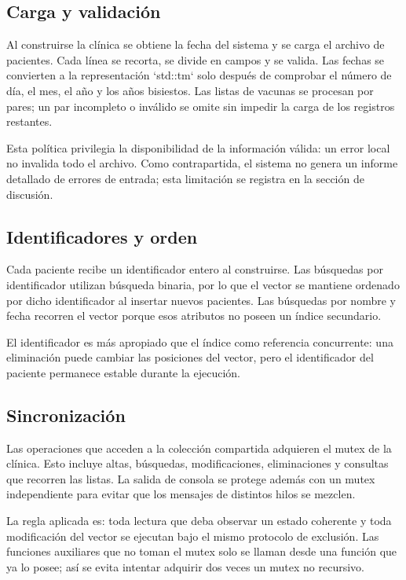 \documentclass[12pt,letterpaper]{article}
\begin{document}
\subsection{Carga y validación}

Al construirse la clínica se obtiene la fecha del sistema y se carga el archivo
de pacientes. Cada línea se recorta, se divide en campos y se valida. Las
fechas se convierten a la representación `std::tm` solo después de comprobar
el número de día, el mes, el año y los años bisiestos. Las listas de vacunas se
procesan por pares; un par incompleto o inválido se omite sin impedir la carga
de los registros restantes.

Esta política privilegia la disponibilidad de la información válida: un error
local no invalida todo el archivo. Como contrapartida, el sistema no genera un
informe detallado de errores de entrada; esta limitación se registra en la
sección de discusión.

\subsection{Identificadores y orden}

Cada paciente recibe un identificador entero al construirse. Las búsquedas por
identificador utilizan búsqueda binaria, por lo que el vector se mantiene
ordenado por dicho identificador al insertar nuevos pacientes. Las búsquedas
por nombre y fecha recorren el vector porque esos atributos no poseen un índice
secundario.

El identificador es más apropiado que el índice como referencia concurrente:
una eliminación puede cambiar las posiciones del vector, pero el identificador
del paciente permanece estable durante la ejecución.

\subsection{Sincronización}

Las operaciones que acceden a la colección compartida adquieren el mutex de la
clínica. Esto incluye altas, búsquedas, modificaciones, eliminaciones y
consultas que recorren las listas. La salida de consola se protege además con
un mutex independiente para evitar que los mensajes de distintos hilos se
mezclen.

La regla aplicada es: toda lectura que deba observar un estado coherente y toda
modificación del vector se ejecutan bajo el mismo protocolo de exclusión. Las
funciones auxiliares que no toman el mutex solo se llaman desde una función que
ya lo posee; así se evita intentar adquirir dos veces un mutex no recursivo.
\end{document}
